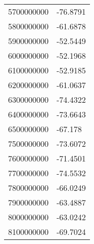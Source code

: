 \begin{tabular}{ll}
5700000000 & -76.8791 \\ 
5800000000 & -61.6878 \\ 
5900000000 & -52.5449 \\ 
6000000000 & -52.1968 \\ 
6100000000 & -52.9185 \\ 
6200000000 & -61.0637 \\ 
6300000000 & -74.4322 \\ 
6400000000 & -73.6643 \\ 
6500000000 & -67.178 \\ 
7500000000 & -73.6072 \\ 
7600000000 & -71.4501 \\ 
7700000000 & -74.5532 \\ 
7800000000 & -66.0249 \\ 
7900000000 & -63.4887 \\ 
8000000000 & -63.0242 \\ 
8100000000 & -69.7024 \\ 
\hline 
\end{tabular}